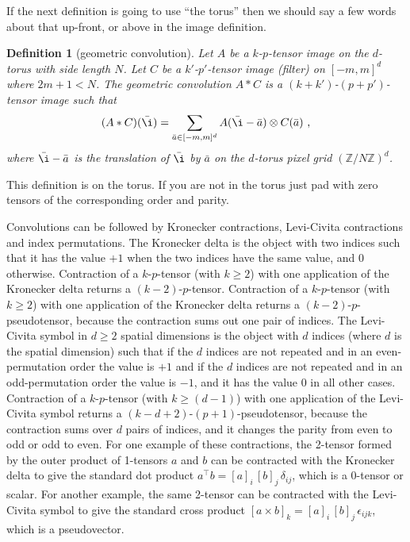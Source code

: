\documentclass{article}
\theoremstyle{plain}
\newtheorem{definition}{Definition}
\begin{document}
If the next definition is going to use ``the torus'' then we should say a few words about that up-front, or above in the image definition.

\begin{definition}[geometric convolution]
Let $A$ be a $k$-$p$-tensor image on the $d$-torus with side length $N$.
Let $C$ be a $k'$-$p'$-tensor image (filter) on $[-m, m]^d$ where $2m+1<N$.
The geometric convolution $A\ast C$ is a $(k+k')$-$(p+p')$-tensor image such that
\begin{equation}
    (A\ast C)(\bar\i) = \sum_{\bar a\in[-m, m]^d} A(\bar\i - \bar a)\otimes C(\bar a) ~,
\end{equation}
where $\bar\i - \bar a$ is the translation of $\bar\i$ by $\bar a$ on the $d$-torus pixel grid $(\mathbb Z / N\mathbb Z)^d$.
\end{definition}
This definition is on the torus. If you are not in the torus just pad with zero tensors of the corresponding order and parity. 

Convolutions can be followed by Kronecker contractions, Levi-Civita contractions and index permutations.
The Kronecker delta is the object with two indices such that it has the value $+1$ when the two indices have the same value, and $0$ otherwise.
Contraction of a $k$-$p$-tensor (with $k\geq 2$) with one application of the Kronecker delta returns a $(k-2)$-$p$-tensor.
Contraction of a $k$-$p$-tensor (with $k\geq 2$) with one application of the Kronecker delta returns a $(k-2)$-$p$-pseudotensor, because the contraction sums out one pair of indices.
The Levi-Civita symbol in $d\geq 2$ spatial dimensions is the object with $d$ indices (where $d$ is the spatial dimension) such that if the $d$ indices are not repeated and in an even-permutation order the value is $+1$ and if the $d$ indices are not repeated and in an odd-permutation order the value is $-1$, and it has the value $0$ in all other cases.
Contraction of a $k$-$p$-tensor (with $k\geq (d-1)$) with one application of the Levi-Civita symbol returns a $(k-d+2)$-$(p+1)$-pseudotensor, because the contraction sums over $d$ pairs of indices, and it changes the parity from even to odd or odd to even.
For one example of these contractions, the 2-tensor formed by the outer product of 1-tensors $a$ and $b$ can be contracted with the Kronecker delta to give the standard dot product $a^\top b = [a]_i\,[b]_j\,\delta_{ij}$, which is a 0-tensor or scalar.
For another example, the same 2-tensor can be contracted with the Levi-Civita symbol to give the standard cross product
$[a\times b]_k = [a]_i\,[b]_j\,\epsilon_{ijk}$, which is a pseudovector.
\end{document}
